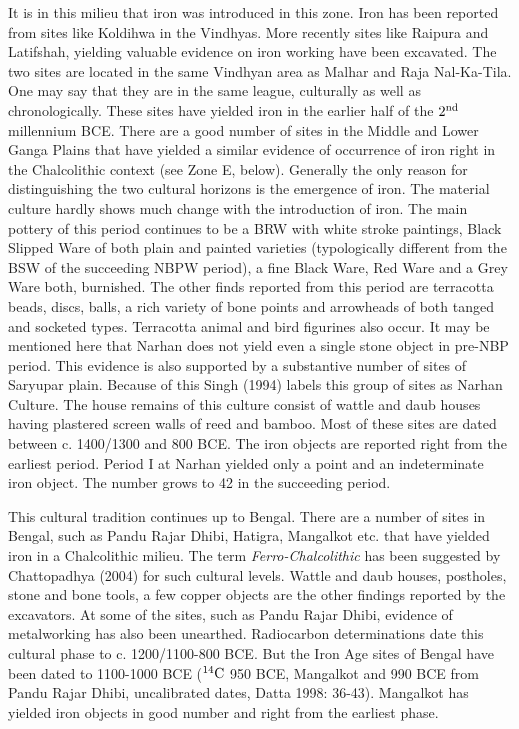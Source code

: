 It is in this milieu that iron was introduced in this zone. Iron has been reported from sites like Koldihwa in the Vindhyas. More recently sites like Raipura and Latifshah, yielding valuable evidence on iron working  have been excavated. The two sites are located in the same Vindhyan area as Malhar and Raja Nal-Ka-Tila. One may say that they are in the same league, culturally as well as chronologically. These sites have yielded iron in the earlier half of the $2^{\rm nd}$ millennium BCE. There are a good number of sites in the Middle and Lower Ganga Plains that have yielded a similar evidence of occurrence of iron right in the Chalcolithic context (see Zone E, below). Generally the only reason for distinguishing the two cultural horizons is the emergence of iron. The material culture hardly shows much change with the introduction of iron. The main pottery of this period continues to be a BRW with white stroke paintings, Black Slipped Ware of both plain and painted varieties (typologically different from the BSW of the succeeding NBPW period), a fine Black Ware, Red Ware and a Grey Ware both, burnished.  The other finds reported from this period are terracotta beads, discs, balls, a rich variety of bone points and arrowheads of both tanged and socketed types. Terracotta animal and bird figurines also occur. It may be mentioned here that Narhan does not yield even a single stone object in pre-NBP period. This evidence is also supported by a substantive number of sites of Saryupar plain. Because of this Singh (1994) labels this group of sites as Narhan Culture. The house remains of this culture consist of wattle and daub houses having plastered screen walls of reed and bamboo. Most of these sites are dated between c. 1400/1300 and 800 BCE.  The iron objects are reported right from the earliest period. Period I at Narhan yielded only a point and an indeterminate iron object. The number grows to 42 in the succeeding period. 

This cultural tradition continues up to Bengal. There are a number of sites in Bengal, such as Pandu Rajar Dhibi, Hatigra, Mangalkot etc. that have yielded iron in a Chalcolithic milieu. The term \textit{Ferro-Chalcolithic} has been suggested by Chattopadhya (2004) for such cultural levels. Wattle and daub houses, postholes, stone and bone tools, a few copper objects are the other findings reported by the excavators. At some of the sites, such as Pandu Rajar Dhibi, evidence of metalworking has also been unearthed. Radiocarbon determinations date this cultural phase to c. 1200/1100-800 BCE. But the Iron Age sites of Bengal have been dated to 1100-1000 BCE ($^{14}{\rm C}$ 950 BCE, Mangalkot and 990 BCE from Pandu Rajar Dhibi, uncalibrated dates, Datta 1998: 36-43). Mangalkot has yielded iron objects in good number and right from the earliest phase. 

